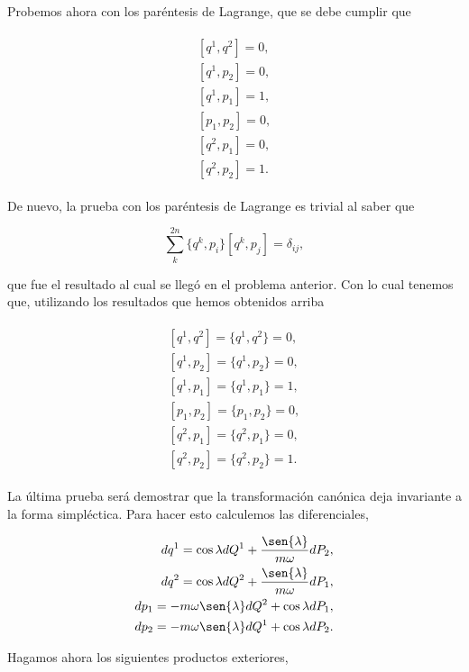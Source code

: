 \documentclass[a4paper,10pt]{article}
\numberwithin{equation}{section}
\begin{document}
Probemos ahora con los paréntesis de Lagrange, que se debe cumplir que

\begin{align}
 \begin{split}
  [q^1,q^2] = 0, \\
  [q^1,p_2] = 0, \\
  [q^1,p_1] = 1, \\
  [p_1,p_2] = 0, \\
  [q^2,p_1] = 0, \\
  [q^2, p_2] = 1.
 \end{split}
\end{align}

De nuevo, la prueba con los paréntesis de Lagrange es trivial al saber que 

\begin{equation}
 \sum_k^{2n} \{q^k,p_i\}[q^k,p_j] = \delta_{ij},
\end{equation}

que fue el resultado al cual se llegó en el problema anterior. Con lo cual tenemos que,
utilizando los resultados que hemos obtenidos arriba

\begin{align}
 \begin{split}
  [q^1,q^2] = \{q^1,q^2\} = 0, \\
  [q^1,p_2] = \{q^1,p_2\} = 0, \\
  [q^1,p_1] = \{q^1, p_1\} = 1, \\
  [p_1,p_2] = \{p_1,p_2\} = 0, \\
  [q^2,p_1] = \{q^2,p_1\} = 0, \\
  [q^2, p_2] = \{q^2,p_2\} = 1.
 \end{split}
\end{align}

La última prueba será demostrar que la transformación canónica deja invariante 
a la forma simpléctica. Para hacer esto calculemos las diferenciales, 

\begin{align}
 dq^1 = \cos{\lambda}dQ^1 + \frac{\sen{\lambda}}{m\omega}dP_2, \\ 
 dq^2 = \cos{\lambda}dQ^2 + \frac{\sen{\lambda}}{m\omega}dP_1, \\
 dp_1 = - m\omega\sen{\lambda} dQ^2 + \cos{\lambda}dP_1, \\
 dp_2 = - m\omega\sen{\lambda} dQ^1 + \cos{\lambda}dP_2.
\end{align}

Hagamos ahora los siguientes productos exteriores, 
\end{document}
